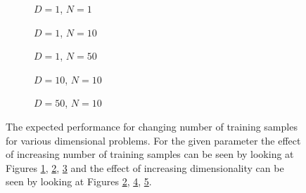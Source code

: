 \begin{figure}[!h]
  \centering
    \begin{subfigure}{0.33\textwidth}
      \centering
      \caption{$D=1$, $N=1$}
      \label{fig:linear-c-N-1-D-1}
    \end{subfigure}
    \begin{subfigure}{0.33\textwidth}
      \centering
      \caption{$D=1$, $N=10$}
      \label{fig:linear-c-N-10-D-1}
    \end{subfigure}
    \begin{subfigure}{0.33\textwidth}
      \centering
      \caption{$D=1$, $N=50$}
      \label{fig:linear-c-N-50-D-1}
    \end{subfigure}

    \begin{subfigure}{0.33\textwidth}
      \centering
      \caption{$D=10$, $N=10$}
      \label{fig:linear-c-N-10-D-10}
    \end{subfigure}
    \begin{subfigure}{0.33\textwidth}
      \centering
      \caption{$D=50$, $N=10$}
      \label{fig:linear-c-N-10-D-50}
    \end{subfigure}  

  \caption{The expected performance for changing number of training samples for various dimensional problems. For the given parameter the effect of increasing number of training samples can be seen by looking at Figures \ref{fig:linear-c-N-1-D-1}, \ref{fig:linear-c-N-10-D-1}, \ref{fig:linear-c-N-50-D-1} and the effect of increasing dimensionality can be seen by looking at Figures \ref{fig:linear-c-N-10-D-1}, \ref{fig:linear-c-N-10-D-10}, \ref{fig:linear-c-N-10-D-50}.}\label{fig:linear-c}
\end{figure}


